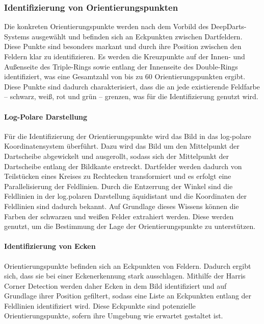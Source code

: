 \subsubsection{Identifizierung von Orientierungspunkten}
\label{sec:orientierungspunkte_finden}

Die konkreten Orientierungspunkte werden nach dem Vorbild des DeepDarts-Systems ausgewählt und befinden sich an Eckpunkten zwischen Dartfeldern. Diese Punkte sind besonders markant und durch ihre Position zwischen den Feldern klar zu identifizieren. Es werden die Kreuzpunkte auf der Innen- und Außenseite des Triple-Rings sowie entlang der Innenseite des Double-Rings identifiziert, was eine Gesamtzahl von bis zu 60 Orientierungspunkten ergibt. Diese Punkte sind dadurch charakterisiert, dass die an jede existierende Feldfarbe -- schwarz, weiß, rot und grün -- grenzen, was für die Identifizierung genutzt wird.

\paragraph{Log-Polare Darstellung}

Für die Identifizierung der Orientierungspunkte wird das Bild in das log-polare Koordinatensystem überführt. Dazu wird das Bild um den Mittelpunkt der Dartscheibe abgewickelt und ausgerollt, sodass sich der Mittelpunkt der Dartscheibe entlang der Bildkante erstreckt. Dartfelder werden dadurch von Teilstücken eines Kreises zu Rechtecken transformiert und es erfolgt eine Parallelisierung der Feldlinien. Durch die Entzerrung der Winkel sind die Feldlinien in der log.polaren Darstellung äquidistant und die Koordinaten der Feldlinien sind dadurch bekannt. Auf Grundlage dieses Wissens können die Farben der schwarzen und weißen Felder extrahiert werden. Diese werden genutzt, um die Bestimmung der Lage der Orientierungspunkte zu unterstützen.

\paragraph{Identifizierung von Ecken}

Orientierungspunkte befinden sich an Eckpunkten von Feldern. Dadurch ergibt sich, dass sie bei einer Eckenerkennung stark ausschlagen. Mithilfe der Harris Corner Detection werden daher Ecken in dem Bild identifiziert und auf Grundlage ihrer Position gefiltert, sodass eine Liste an Eckpunkten entlang der Feldlinien identifiziert wird. Diese Eckpunkte sind potenzielle Orientierungspunkte, sofern ihre Umgebung wie erwartet gestaltet ist.

